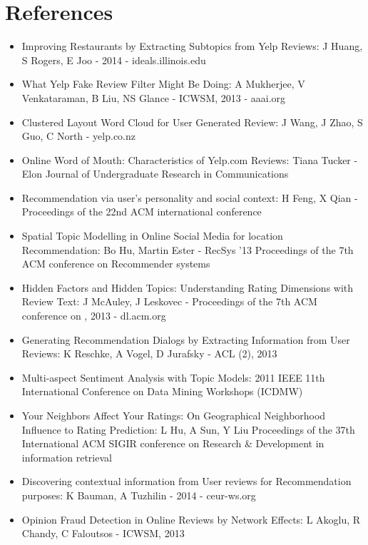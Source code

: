 \documentclass[12pt]{article} %
\begin{document}
\section{References}
\begin{itemize}
\item Improving Restaurants by Extracting Subtopics from Yelp Reviews: J Huang, S Rogers, E Joo - 2014 - ideals.illinois.edu
\item What Yelp Fake Review Filter Might Be Doing: A Mukherjee, V Venkataraman, B Liu, NS Glance - ICWSM, 2013 - aaai.org
\item Clustered Layout Word Cloud for User Generated Review: J Wang, J Zhao, S Guo, C North - yelp.co.nz
\item Online Word of Mouth: Characteristics of Yelp.com Reviews: Tiana Tucker - Elon Journal of Undergraduate Research in Communications
\item Recommendation via user's personality and social context: H Feng, X Qian - Proceedings of the 22nd ACM international conference
\item Spatial Topic Modelling in Online Social Media for location Recommendation:  Bo Hu, Martin Ester - RecSys '13  Proceedings of the 7th ACM conference on Recommender systems
\item Hidden Factors and Hidden Topics: Understanding Rating Dimensions with Review Text: J McAuley, J Leskovec - Proceedings of the 7th ACM conference on , 2013 - dl.acm.org
\item Generating Recommendation Dialogs by Extracting Information from User Reviews: K Reschke, A Vogel, D Jurafsky - ACL (2), 2013
\item Multi-aspect Sentiment Analysis with Topic Models: 2011 IEEE 11th International Conference on Data Mining Workshops (ICDMW)
\item Your Neighbors Affect Your Ratings: On Geographical Neighborhood Influence to Rating Prediction: L Hu, A Sun, Y Liu  Proceedings of the 37th International ACM SIGIR conference on Research \& Development in information retrieval
\item Discovering contextual information from User reviews for Recommendation purposes: K Bauman, A Tuzhilin - 2014 - ceur-ws.org
\item Opinion Fraud Detection in Online Reviews by Network Effects: L Akoglu, R Chandy, C Faloutsos - ICWSM, 2013
\end{itemize}
\end{document}
